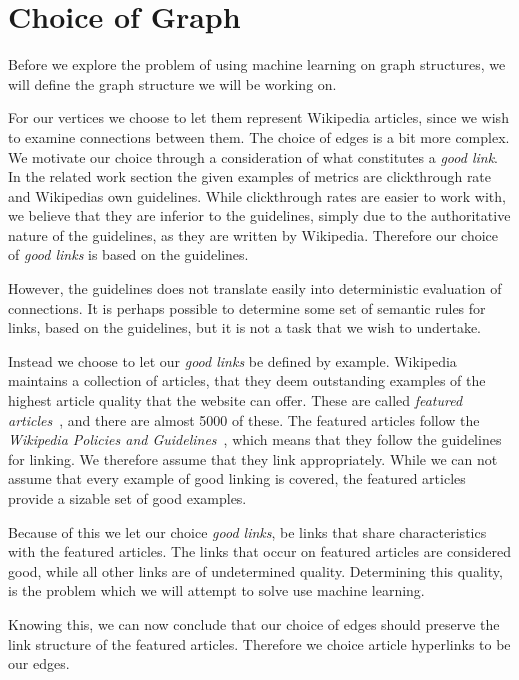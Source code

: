 \section{Choice of Graph}\label{sec:choice_of_graph}
Before we explore the problem of using machine learning on graph structures, we will define the graph structure we will be working on.

For our vertices we choose to let them represent Wikipedia articles, since we wish to examine connections between them. The choice of edges is a bit more complex. We motivate our choice through a consideration of what constitutes a \emph{good link}. In the related work section the given examples of metrics are clickthrough rate and Wikipedias own guidelines. While clickthrough rates are easier to work with, we believe that they are inferior to the guidelines, simply due to the authoritative nature of the guidelines, as they are written by Wikipedia. Therefore our choice of \emph{good links} is based on the guidelines.

However, the guidelines does not translate easily into deterministic evaluation of connections. It is perhaps possible to determine some set of semantic rules for links, based on the guidelines, but it is not a task that we wish to undertake.

Instead we choose to let our \emph{good links} be defined by example. Wikipedia maintains a collection of articles, that they deem outstanding examples of the highest article quality that the website can offer. These are called \emph{featured articles}~\cite{wiki-featured-articles}, and there are almost 5000 of these. The featured articles follow the \emph{Wikipedia Policies and Guidelines}~\cite{wiki-editor-guidelines}, which means that they follow the guidelines for linking. We therefore assume that they link appropriately. While we can not assume that every example of good linking is covered, the featured articles provide a sizable set of good examples.

Because of this we let our choice \emph{good links}, be links that share characteristics with the featured articles. The links that occur on featured articles are considered good, while all other links are of undetermined quality. Determining this quality, is the problem which we will attempt to solve use machine learning.

Knowing this, we can now conclude that our choice of edges should preserve the link structure of the featured articles. Therefore we choice article hyperlinks to be our edges.

